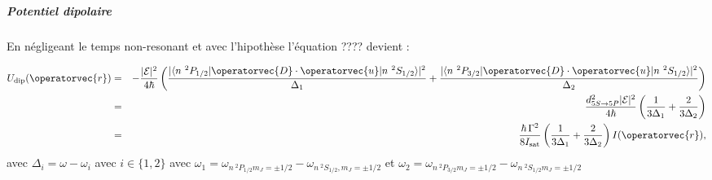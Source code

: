 	


\subparagraph{Potentiel dipolaire}

En négligeant le temps non-resonant et avec l'hipothèse  l'équation ???? devient :

\begin{eqnarray*}
	U_{\mathrm{dip}}(\operatorvec{r}) &  = & - \frac{ \vert \mathcal{E} \vert^2}{4 \hbar} \left( \frac{ \vert \langle n {~}^2P_{1/2}  \vert \operatorvec{D} \cdot \operatorvec{u}\vert n {~}^2S_{1/2}  \rangle \vert^2}{ \Delta_1} + \frac{ \vert\langle n {~}^2P_{3/2}  \vert \operatorvec{D} \cdot \operatorvec{u}\vert n {~}^2S_{1/2}  \rangle \vert^2}{ \Delta_2}  \right )\\ & = &  \frac{  d_{\scriptstyle 5S \rightarrow 5P}^2 \vert \mathcal{E} \vert^2 }{4 \hbar} \left( \frac{ 1}{ 3 \Delta_1} + \frac{2 }{ 3 \Delta_2}  \right ) \\&=& \frac{\hbar \, \Gamma^2}{8 I_{\mathrm{sat}}} \left( \frac{ 1}{ 3 \Delta_1} + \frac{2 }{ 3 \Delta_2}  \right ) I(\operatorvec{r}) ,		
\end{eqnarray*}
avec $\Delta_i = \omega -\omega_i $ avec $ i \in \{ 1 , 2 \}$ avec $\omega_1 = \omega_{n {~}^2P_{1/2} m_J = \pm  1/2}- \omega_{n {~}^2S_{1/2}, m_J = \pm  1/2}$ et $\omega_2 = \omega_{n {~}^2P_{3/2} m_J = \pm  1/2} - \omega_{n {~}^2S_{1/2}  m_J = \pm  1/2}$


